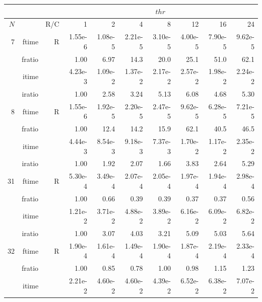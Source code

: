 \documentclass[a4paper]{article}
\begin{document}
\begin{table}
\begin{center}
\begin{tabular}{|r|r|r|r|r|r|r|r|r|r|}
\hline 
     \multicolumn{3}{|c|}{ } & \multicolumn{7}{c|}{$thr$} \\ \hline
    $N$  & & R/C  & 1           & 2    & 4    & 8    & 12   & 16    & 24  \\ \hline\hline
    7  & ftime & R  &  1.55e-6 &   1.08e-5 &   2.21e-5 &   3.10e-5 &   4.00e-5 &   7.90e-5 &   9.62e-5     \\ 
    & fratio & &       1.00 &   6.97 &   14.3 &   20.0 &   25.1 &   51.0 &   62.1    \\ 
     & itime & &       4.23e-3 &   1.09e-2 &   1.37e-2 &   2.17e-2 &   2.57e-2 &   1.98e-2 &   2.24e-2       \\ 
     & iratio & &      1.00 &   2.58 &   3.24 &   5.13 &   6.08 &   4.68 &   5.30         \\ \hline 
    8  & ftime & R  &  1.55e-6 &   1.92e-5 &   2.20e-5 &   2.47e-5 &   9.62e-5 &   6.28e-5 &   7.21e-5     \\ 
      & fratio & &     1.00 &   12.4 &   14.2 &   15.9 &   62.1 &   40.5 &   46.5      \\ 
     & itime & &       4.44e-3 &   8.54e-3 &   9.18e-3 &   7.37e-3 &   1.70e-2 &   1.17e-2 &   2.35e-2        \\ 
     & iratio & &      1.00 &   1.92 &   2.07 &   1.66 &   3.83 &   2.64 &   5.29        \\ \hline 
   31  & ftime & R  &  5.30e-4 &   3.49e-4 &   2.07e-4 &   2.05e-4 &   1.97e-4 &   1.94e-4 &   2.98e-4   \\ 
      & fratio & &     1.00 &   0.66 &   0.39 &   0.39 &   0.37 &   0.37 &   0.56       \\ 
     & itime & &       1.21e-2 &   3.71e-2 &   4.88e-2 &   3.89e-2 &   6.16e-2 &   6.09e-2 &   6.82e-2       \\ 
     & iratio & &      1.00 &   3.07 &   4.03 &   3.21 &   5.09 &   5.03 &   5.64       \\ \hline 
   32  & ftime & R  &  1.90e-4 &   1.61e-4 &   1.49e-4 &   1.90e-4 &   1.87e-4 &   2.19e-4 &   2.33e-4    \\ 
      & fratio & &     1.00 &   0.85 &   0.78 &   1.00 &   0.98 &   1.15 &   1.23        \\ 
     & itime & &       2.21e-2 &   4.60e-2 &   4.60e-2 &   4.39e-2 &   6.52e-2 &   6.38e-2 &   7.07e-2        \\ 

\end{tabular}
\end{center}
\end{table}
\end{document}
